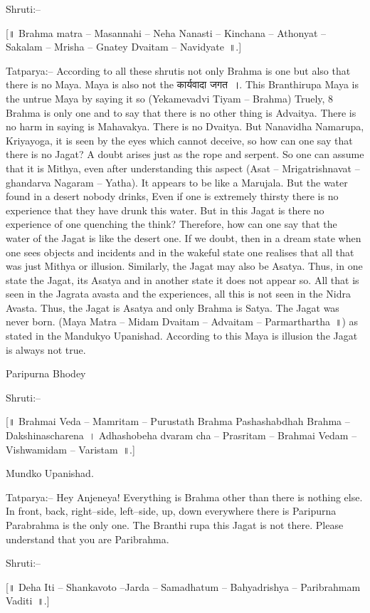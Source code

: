 Shruti:–

[॥ Brahma matra – Masannahi – Neha Nanasti – Kinchana – Athonyat – Sakalam – Mrisha – Gnatey Dvaitam – Navidyate~॥.]

Tatparya:– According to all these shrutis not only Brahma is one but also that there is no Maya. Maya is also not the कार्यवादा जगत~।. This Branthirupa Maya is the untrue Maya by saying it so (Yekamevadvi Tiyam – Brahma) Truely, 8 Brahma is only one and to say that there is no other thing is Advaitya. There is no harm in saying is Mahavakya. There is no Dvaitya. But Nanavidha Namarupa, Kriyayoga, it is seen by the eyes which cannot deceive, so how can one say that there is no Jagat? A doubt arises just as the rope and serpent. So one can assume that it is Mithya, even after understanding this aspect (Asat – Mrigatrishnavat – ghandarva Nagaram – Yatha). It appears to be like a Marujala. But the water found in a desert nobody drinks, Even if one is extremely thirsty there is no experience that they have drunk this water. But in this Jagat is there no experience of one quenching the think? Therefore, how can one say that the water of the Jagat is like the desert one. If we doubt, then in a dream state when one sees objects and incidents and in the wakeful state one realises that all that was just Mithya or illusion. Similarly, the Jagat may also be Asatya. Thus, in one state the Jagat, its Asatya and in another state it does not appear so. All that is seen in the Jagrata avasta and the experiences, all this is not seen in the Nidra Avasta. Thus, the Jagat is Asatya and only Brahma is Satya. The Jagat was never born. (Maya Matra – Midam Dvaitam – Advaitam – Parmarthartha~॥) as stated in the Mandukyo Upanishad. According to this Maya is illusion the Jagat is always not true.

Paripurna Bhodey

Shruti:–

[॥ Brahmai Veda – Mamritam – Purustath Brahma Pashashabdhah Brahma – Dakshinascharena~। Adhashobeha dvaram cha – Prasritam – Brahmai Vedam – Vishwamidam – Varistam~॥.]

Mundko Upanishad.

Tatparya:– Hey Anjeneya! Everything is Brahma other than there is nothing else. In front, back, right–side, left–side, up, down everywhere there is Paripurna Parabrahma is the only one. The Branthi rupa this Jagat is not there. Please understand that you are Paribrahma.

Shruti:–

[॥ Deha Iti – Shankavoto –Jarda – Samadhatum – Bahyadrishya – Paribrahmam Vaditi~॥.]

